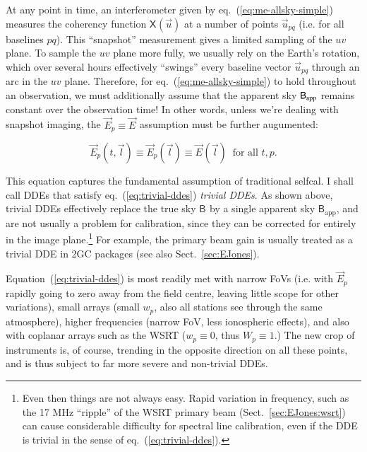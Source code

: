 \documentclass[]{aa}
\newcommand{\jones}[2]{\vec {#1}_{#2}}
\newcommand{\coh}[2]{\mathsf{{#1}}_{{#2}}}
\begin{document}
At any point in time, an interferometer given by eq.~(\ref{eq:me-allsky-simple}) measures the coherency function $\coh{X}{}(\vec u)$ at a number of points $\vec u_{pq}$ (i.e. for all baselines $pq$). This ``snapshot'' measurement gives a limited sampling of the $uv$ plane. To sample the $uv$ plane more fully, we usually rely on the Earth's rotation, which over several hours effectively ``swings'' every baseline vector $\vec u_{pq}$ through an arc in the $uv$ plane. Therefore, for eq.~(\ref{eq:me-allsky-simple}) to hold throughout an observation, we must additionally assume that the apparent sky $\coh{B}{\rm app}$ remains constant over the observation time! In other words, unless we're dealing with snapshot imaging, the $\jones{E}{p}\equiv\jones{E}{}$ assumption must be further augumented:

\begin{equation}\label{eq:trivial-ddes}
\jones{E}{p}(t,\vec l) \equiv \jones{E}{p}(\vec l) \equiv \jones{E}{}(\vec l)\;\;\mbox{for all~} t,p. 
\end{equation}

This equation captures the fundamental assumption of traditional selfcal. I shall call DDEs that satisfy eq.~(\ref{eq:trivial-ddes}) \emph{trivial DDEs}. As shown above, trivial DDEs effectively replace the true sky $\coh{B}{}$ by a single apparent sky $\coh{B}{\mathrm{app}}$, and are not usually a problem for calibration, since they can be corrected for entirely in the image plane.\footnote{Even then things are not always easy. Rapid variation in frequency, such as the 17 MHz ``ripple'' of the WSRT primary beam (Sect.~\ref{sec:EJones:wsrt}) can cause considerable difficulty for spectral line calibration, even if the DDE is trivial in the sense of eq.~(\ref{eq:trivial-ddes}).}  For example, the primary beam gain is usually treated as a trivial DDE in 2GC packages (see also Sect.~\ref{sec:EJones}). 

Equation~(\ref{eq:trivial-ddes}) is most readily met with narrow FoVs (i.e. with $\jones{E}{p}$ rapidly going to zero away from the field centre, leaving little scope for other variations), small arrays (small $w_p$, also all stations see through the same atmosphere), higher frequencies (narrow FoV, less ionospheric effects), and also with coplanar arrays such as the WSRT ($w_p\equiv0$, thus $W_p\equiv1$.) The new crop of instruments is, of course, trending in the opposite direction on all these points, and is thus subject to far more severe and non-trivial DDEs.
\end{document}
